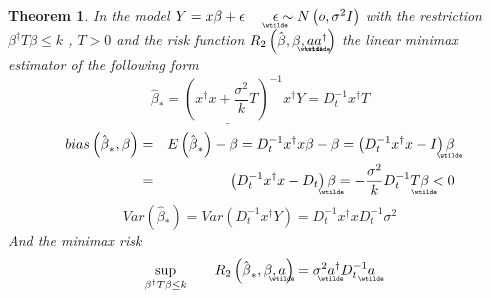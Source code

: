 \documentclass{article}
\newtheorem{theorem}{Theorem}
\begin{document}
\begin{theorem}
In the model $Y=x\beta +\epsilon \qquad 
\underaccent{\wtilde}{\epsilon}%
\sim N\left( o,\sigma ^{2}I\right) $ with the restriction $\beta ^{\dagger
}T\beta \leq k$ , $T>0$ and the risk function $R_{2}\left( \hat{\beta},\beta
,%
\underaccent{\wtilde}{a}%
\underaccent{\wtilde}{a}%
^{\dagger }\right) $ the linear minimax estimator of the following form%
\begin{equation*}
\underline{\hat{\beta}_{\ast }=\left( x^{\dagger }x+\frac{\sigma ^{2}}{k}%
T\right) ^{-1}x^{\dagger }Y}=D_{t}^{-1}x^{\dagger }T
\end{equation*}%
\begin{eqnarray*}
bias\left( \hat{\beta}_{\ast },\beta \right)  &=&E\left( \hat{\beta}_{\ast
}\right) -\beta =D_{t}^{-1}x^{\dagger }x\beta -\beta =\left(
D_{t}^{-1}x^{\dagger }x-I\right) 
\underaccent{\wtilde}{\beta}
\\
&=&\left( D_{t}^{-1}x^{\dagger }x-D_{t}\right) 
\underaccent{\wtilde}{\beta}%
=-\frac{\sigma ^{2}}{k}D_{t}^{-1}T%
\underaccent{\wtilde}{\beta}%
<0
\end{eqnarray*}%
\begin{equation*}
Var\left( \hat{\beta}_{\ast }\right) =Var\left( D_{t}^{-1}x^{\dagger
}Y\right) =D_{t}^{-1}x^{\dagger }xD_{t}^{-1}\sigma ^{2}
\end{equation*}%
And the minimax risk%
\begin{equation*}
\underset{\beta ^{\dagger }T\beta \leq k}{\sup }\qquad R_{2}\left( \hat{\beta%
}_{\ast },\beta ,%
\underaccent{\wtilde}{a}%
\right) =\sigma ^{2}%
\underaccent{\wtilde}{a}%
^{\dagger }D_{t}^{-1}%
\underaccent{\wtilde}{a}%
\end{equation*}
\end{theorem}
\end{document}
